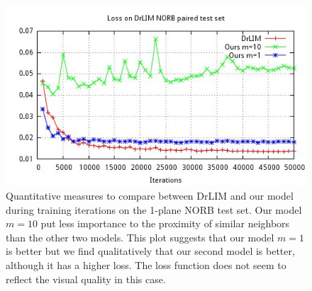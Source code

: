 \documentclass[a4paper,12pt]{report}
\begin{document}
\begin{figure}[h]
    \begin{center}
        \includegraphics{thesis_figures/final_loss_testv3.jpg}
    \end{center}
    \caption{Quantitative measures to compare between DrLIM and our model during training iterations on the 1-plane NORB test set.
    Our model $m=10$ put less importance to the proximity of similar neighbors than the other two models.
    This plot suggests that our model $m=1$ is better but we find qualitatively that our second model is better, although it has a higher loss.
    The loss function does not seem to reflect the visual quality in this case.
    }
    \label{fig:loss_norb_test_common}
\end{figure}
\end{document}
